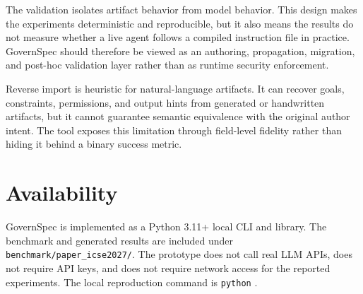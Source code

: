 \documentclass[10pt,conference]{IEEEtran}
\begin{document}
The validation isolates artifact behavior from model behavior. This design makes the
experiments deterministic and reproducible, but it also means the results do not
measure whether a live agent follows a compiled instruction file in practice.
GovernSpec should therefore be viewed as an authoring, propagation, migration, and
post-hoc validation layer rather than as runtime security enforcement.

Reverse import is heuristic for natural-language artifacts. It can recover goals,
constraints, permissions, and output hints from generated or handwritten artifacts,
but it cannot guarantee semantic equivalence with the original author intent. The
tool exposes this limitation through field-level fidelity rather than hiding it
behind a binary success metric.

\section{Availability}

GovernSpec is implemented as a Python 3.11+ local CLI and library. The benchmark and
generated results are included under \texttt{benchmark/paper\_icse2027/}. The
prototype does not call real LLM APIs, does not require API keys, and does not
require network access for the reported experiments. The local reproduction command
is \texttt{python} .
\end{document}
